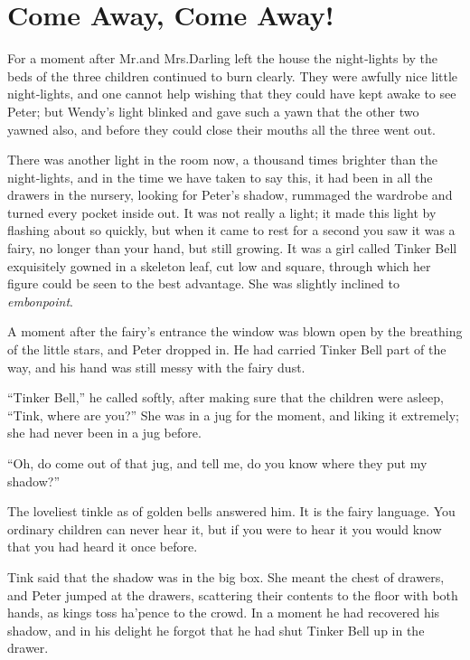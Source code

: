 
\chapter{Come Away, Come Away!}

For a moment after Mr.\@ and Mrs.\@ Darling left the house
the night‐lights by the beds of the three children continued to burn clearly.
They were awfully nice little night‐lights,
and one cannot help wishing that they could have kept awake to see Peter;
but Wendy’s light blinked and gave such a yawn that the other two yawned also,
and before they could close their mouths all the three went out.

There was another light in the room now, a thousand times brighter than the night‐lights,
and in the time we have taken to say this, it had been in all the drawers in the nursery,
looking for Peter’s shadow, rummaged the wardrobe and turned every pocket inside out.
It was not really a light;
it made this light by flashing about so quickly,
but when it came to rest for a second you saw it was a fairy, no longer than your hand, but still growing.
It was a girl called Tinker Bell exquisitely gowned in a skeleton leaf, cut low and square,
through which her figure could be seen to the best advantage.
She was slightly inclined to \emph{embonpoint}.

A moment after the fairy’s entrance the window was blown open by the breathing of the little stars,
and Peter dropped in.
He had carried Tinker Bell part of the way, and his hand was still messy with the fairy dust.

“Tinker Bell,” he called softly, after making sure that the children were asleep,
“Tink, where are you?”
She was in a jug for the moment, and liking it extremely;
she had never been in a jug before.

“Oh, do come out of that jug, and tell me, do you know where they put my shadow?”

The loveliest tinkle as of golden bells answered him.
It is the fairy language.
You ordinary children can never hear it,
but if you were to hear it you would know that you had heard it once before.

Tink said that the shadow was in the big box.
She meant the chest of drawers, and Peter jumped at the drawers,
scattering their contents to the floor with both hands, as kings toss ha’pence to the crowd.
In a moment he had recovered his shadow,
and in his delight he forgot that he had shut Tinker Bell up in the drawer.

